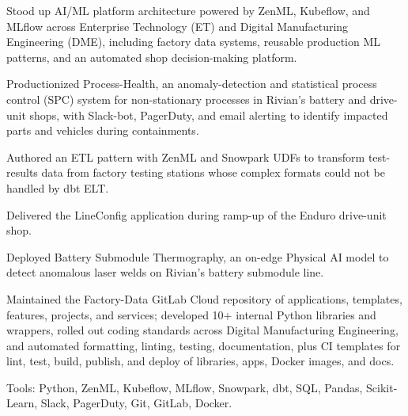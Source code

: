 \documentclass[]{template}
\begin{document}
\sectionsep
{}

\vspace{\topsep}

\begin{tightemize}
\item Stood up AI/ML platform architecture powered by ZenML, Kubeflow, and MLflow across Enterprise Technology (ET) and Digital Manufacturing Engineering (DME), including factory data systems, reusable production ML patterns, and an automated shop decision-making platform.

\item Productionized Process-Health, an anomaly-detection and statistical process control (SPC) system for non-stationary processes in Rivian's battery and drive-unit shops, with Slack-bot, PagerDuty, and email alerting to identify impacted parts and vehicles during containments.

\item Authored an ETL pattern with ZenML and Snowpark UDFs to transform test-results data from factory testing stations whose complex formats could not be handled by dbt ELT.

\item Delivered the LineConfig application during ramp-up of the Enduro drive-unit shop.

\item Deployed Battery Submodule Thermography, an on-edge Physical AI model to detect anomalous laser welds on Rivian's battery submodule line.

\item Maintained the Factory-Data GitLab Cloud repository of applications, templates, features, projects, and services; developed 10+ internal Python libraries and wrappers, rolled out coding standards across Digital Manufacturing Engineering, and automated formatting, linting, testing, documentation, plus CI templates for lint, test, build, publish, and deploy of libraries, apps, Docker images, and docs.

\item Tools: Python, ZenML, Kubeflow, MLflow, Snowpark, dbt, SQL, Pandas, Scikit-Learn, Slack, PagerDuty, Git, GitLab, Docker.
\end{tightemize}
\sectionsep


\sectionsep
{}
\end{document}
